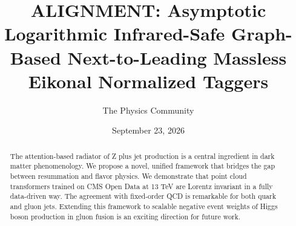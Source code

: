 \documentclass[11pt]{article}
\title{ALIGNMENT: Asymptotic Logarithmic Infrared-Safe Graph-Based Next-to-Leading Massless Eikonal Normalized Taggers}
\author{The Physics Community}
\date{September 23, 2026}
\numberwithin{equation}{section}
\theoremstyle{definition}
\theoremstyle{remark}
\begin{document}
\maketitle
\begin{abstract}
The attention-based radiator of Z plus jet production is a central
ingredient in dark matter phenomenology. We propose a novel, unified
framework that bridges the gap between resummation and flavor physics.
We demonstrate that point cloud transformers trained on CMS Open Data at
13 TeV are Lorentz invariant in a fully data-driven way. The agreement
with fixed-order QCD is remarkable for both quark and gluon jets.
Extending this framework to scalable negative event weights of Higgs
boson production in gluon fusion is an exciting direction for future
work.
\end{abstract}
\tableofcontents




\nocite{*}


\end{document}
